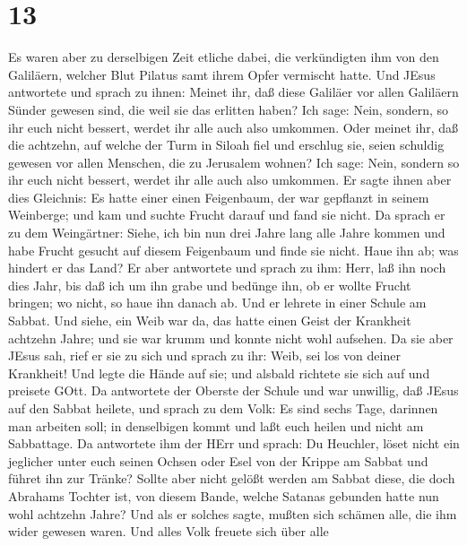 \hypertarget{section-12}{%
\section{13}\label{section-12}}

 Es waren aber zu derselbigen Zeit etliche dabei, die
verkündigten ihm von den Galiläern, welcher Blut Pilatus samt ihrem
Opfer vermischt hatte.  Und JEsus antwortete und sprach zu
ihnen: Meinet ihr, daß diese Galiläer vor allen Galiläern Sünder gewesen
sind, die weil sie das erlitten haben?  Ich sage: Nein,
sondern, so ihr euch nicht bessert, werdet ihr alle auch also umkommen.
 Oder meinet ihr, daß die achtzehn, auf welche der Turm in
Siloah fiel und erschlug sie, seien schuldig gewesen vor allen Menschen,
die zu Jerusalem wohnen?  Ich sage: Nein, sondern so ihr
euch nicht bessert, werdet ihr alle auch also umkommen.  Er
sagte ihnen aber dies Gleichnis: Es hatte einer einen Feigenbaum, der
war gepflanzt in seinem Weinberge; und kam und suchte Frucht darauf und
fand sie nicht.  Da sprach er zu dem Weingärtner: Siehe, ich
bin nun drei Jahre lang alle Jahre kommen und habe Frucht gesucht auf
diesem Feigenbaum und finde sie nicht. Haue ihn ab; was hindert er das
Land?  Er aber antwortete und sprach zu ihm: Herr, laß ihn
noch dies Jahr, bis daß ich um ihn grabe und bedünge ihn, 
ob er wollte Frucht bringen; wo nicht, so haue ihn danach ab.
 Und er lehrete in einer Schule am Sabbat. 
Und siehe, ein Weib war da, das hatte einen Geist der Krankheit achtzehn
Jahre; und sie war krumm und konnte nicht wohl aufsehen. 
Da sie aber JEsus sah, rief er sie zu sich und sprach zu ihr: Weib, sei
los von deiner Krankheit!  Und legte die Hände auf sie; und
alsbald richtete sie sich auf und preisete GOtt.  Da
antwortete der Oberste der Schule und war unwillig, daß JEsus auf den
Sabbat heilete, und sprach zu dem Volk: Es sind sechs Tage, darinnen man
arbeiten soll; in denselbigen kommt und laßt euch heilen und nicht am
Sabbattage.  Da antwortete ihm der HErr und sprach: Du
Heuchler, löset nicht ein jeglicher unter euch seinen Ochsen oder Esel
von der Krippe am Sabbat und führet ihn zur Tränke?  Sollte
aber nicht gelößt werden am Sabbat diese, die doch Abrahams Tochter ist,
von diesem Bande, welche Satanas gebunden hatte nun wohl achtzehn Jahre?
 Und als er solches sagte, mußten sich schämen alle, die
ihm wider gewesen waren. Und alles Volk freuete sich über alle
